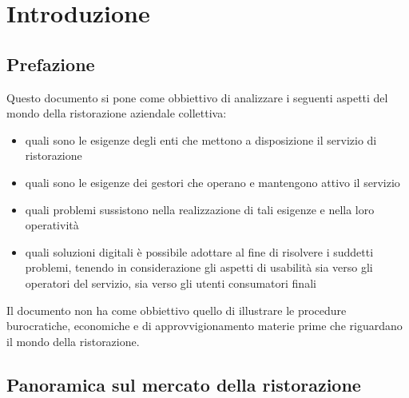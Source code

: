 \documentclass[a4paper, titlepage, 12pt, openright, twoside]{book}
\begin{document}
\begin{frontespizio}
\end{frontespizio}

\tableofcontents

\chapter{Introduzione}\label{chap:introduzione}

\section{Prefazione}

Questo documento si pone come obbiettivo di analizzare i seguenti aspetti del mondo della ristorazione aziendale collettiva:
\begin{itemize}
	\item quali sono le esigenze degli enti che mettono a disposizione il servizio di ristorazione
	\item quali sono le esigenze dei gestori che operano e mantengono attivo il servizio
	\item quali problemi sussistono nella realizzazione di tali esigenze e nella loro operatività
	\item quali soluzioni digitali è possibile adottare al fine di risolvere i suddetti problemi, tenendo in considerazione
		  gli aspetti di usabilità sia verso gli operatori del servizio, sia verso gli utenti consumatori finali
\end{itemize}

Il documento non ha come obbiettivo quello di illustrare le procedure burocratiche, economiche e di approvvigionamento materie prime che riguardano il mondo della ristorazione.

\section{Panoramica sul mercato della ristorazione}
\end{document}
